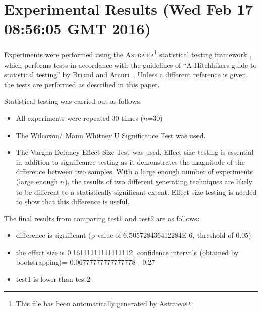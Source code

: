 \documentclass[]{article}
\begin{document}
\section{Experimental Results (Wed Feb 17 08:56:05 GMT 2016)}
Experiments were performed using the \textsc{Astraiea}\footnote{This file has been automatically generated by Astraiea} statistical testing framework \cite{Neumann:2014:EET:2598394.2609850},
which performs tests in accordance with the guidelines of ``A Hitchhikers guide to statistical testing''
by Briand and Arcuri~\cite{Arcuri2012}.
Unless a different reference is given, the tests are performed as described in this paper.



Statistical testing was carried out as follows: 
\begin{itemize}
\item{All experiments were repeated 30 times ($n$=30)}
\item{The Wilcoxon/ Mann Whitney U Significance Test was used.}
\item{The Vargha Delaney Effect Size Test was used. Effect size testing is essential in addition to significance testing as it demonstrates the magnitude of the difference between two samples. With a large enough number of experiments (large enough $n$), the results of two different generating techniques are likely to be different to a statistically significant extent. Effect size testing is needed to show that this difference is useful.}
\end{itemize}
The final results from comparing test1 and test2 are as follows:
\begin{itemize}
\item{difference is significant (p value of 6.505728436412284E-6, threshold of 0.05)}
\item{the effect size is 0.16111111111111112, confidence intervals (obtained by bootstrapping)= 0.06777777777777778 - 0.27}
\item{test1 is lower than test2}
\end{itemize}
\end{document}
